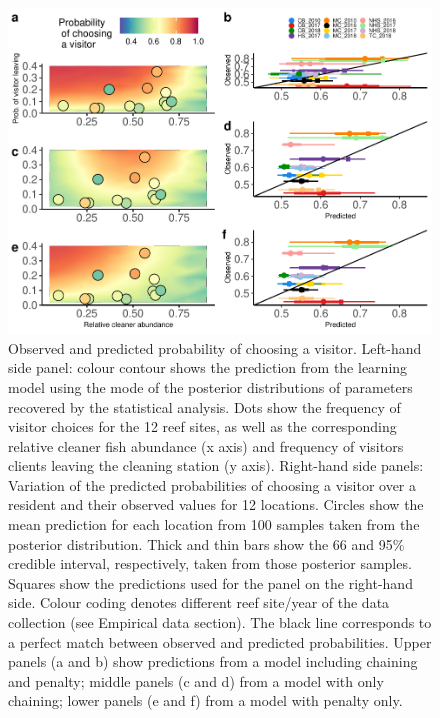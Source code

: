 \documentclass[
  12pt,
]{article}
\begin{document}
\begin{figure}
\includegraphics[width=1\linewidth]{manuscript_BE_files/figure-latex/pred-1} \caption{Observed and predicted probability of choosing a visitor. Left-hand side panel: colour contour shows the prediction from the learning model using the mode of the posterior distributions of parameters recovered by the statistical analysis. Dots show the frequency of visitor choices for the 12 reef sites, as well as the corresponding relative cleaner fish abundance (x axis) and frequency of visitors clients leaving the cleaning station (y axis). Right-hand side panels: Variation of the predicted probabilities  of choosing a visitor over a resident and their observed values for 12 locations. Circles show the mean prediction for each location from 100 samples taken from the posterior distribution. Thick and thin bars show the 66 and 95\% credible interval, respectively, taken from those posterior samples. Squares show the predictions used for the panel on the right-hand side. Colour coding denotes different reef site/year of the data collection (see Empirical data section). The black line corresponds to a perfect match between observed and predicted probabilities. Upper panels (a and b) show predictions from a model including chaining and penalty; middle panels (c and d) from a  model with only chaining; lower panels (e and f) from a model with penalty only.}\label{fig:pred}
\end{figure}
\end{document}
